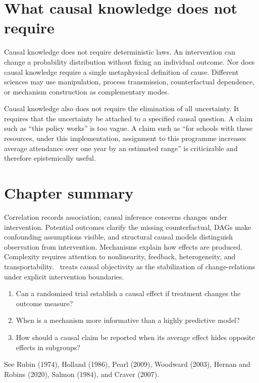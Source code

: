\section{What causal knowledge does not require}

Causal knowledge does not require deterministic laws. An intervention can
change a probability distribution without fixing an individual outcome. Nor
does causal knowledge require a single metaphysical definition of cause.
Different sciences may use manipulation, process transmission, counterfactual
dependence, or mechanism construction as complementary modes.

Causal knowledge also does not require the elimination of all uncertainty. It
requires that the uncertainty be attached to a specified causal question. A
claim such as \enquote{this policy works} is too vague. A claim such as \enquote{for
schools with these resources, under this implementation, assignment to this
programme increases average attendance over one year by an estimated range} is
criticizable and therefore epistemically useful.

\section*{Chapter summary}

Correlation records association; causal inference concerns changes under
intervention. Potential outcomes clarify the missing counterfactual, DAGs make
confounding assumptions visible, and structural causal models distinguish
observation from intervention. Mechanisms explain how effects are produced.
Complexity requires attention to nonlinearity, feedback, heterogeneity, and
transportability. \RCR\ treats causal objectivity as the stabilization of
change-relations under explicit intervention boundaries.

\begin{discussion}
\begin{enumerate}
\item Can a randomized trial establish a causal effect if treatment changes
the outcome measure?
\item When is a mechanism more informative than a highly predictive model?
\item How should a causal claim be reported when its average effect hides
opposite effects in subgroups?
\end{enumerate}
\end{discussion}

\begin{furtherreading}
See Rubin (1974), Holland (1986), Pearl (2009), Woodward (2003), Hernan and
Robins (2020), Salmon (1984), and Craver (2007).
\end{furtherreading}

